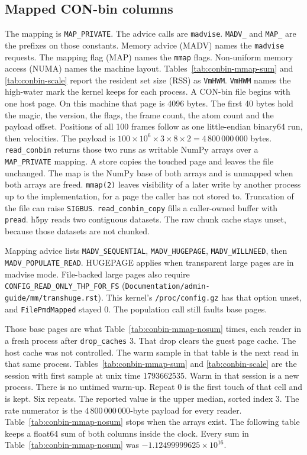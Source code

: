 \subsection{Mapped CON-bin columns} \label{sec:conbin-mmap}

The mapping is \texttt{MAP\_PRIVATE}.
The advice calls are \texttt{madvise}.
\texttt{MADV\_} and \texttt{MAP\_} are the prefixes on those constants.
Memory advice (MADV) names the \texttt{madvise} requests.
The mapping flag (MAP) names the \texttt{mmap} flags.
Non-uniform memory access (NUMA) names the machine layout.
Tables~\ref{tab:conbin-mmap-sum} and \ref{tab:conbin-scale} report the
resident set size (RSS) as \texttt{VmHWM}.
\texttt{VmHWM} names the high-water mark the kernel keeps for each
process.
A CON-bin file begins with one host page.
On this machine that page is 4096 bytes.
The first 40 bytes hold the magic, the version, the flags, the frame
count, the atom count and the payload offset.
Positions of all 100 frames follow as one little-endian binary64 run,
then velocities.
The payload is
\(100 \times 10^{6} \times 3 \times 8 \times 2 = 4\,800\,000\,000\)
bytes.
\texttt{read\_conbin} returns those two runs as writable NumPy arrays
over a \texttt{MAP\_PRIVATE} mapping.
A store copies the touched page and leaves the file unchanged.
The map is the NumPy base of both arrays and is unmapped when both
arrays are freed.
\texttt{mmap(2)} leaves visibility of a later write by another process
up to the implementation, for a page the caller has not stored to.
Truncation of the file can raise \texttt{SIGBUS}.
\texttt{read\_conbin\_copy} fills a caller-owned buffer with
\texttt{pread}.
h5py reads two contiguous datasets.
The raw chunk cache stays unset, because those datasets are not chunked.

Mapping advice lists \texttt{MADV\_SEQUENTIAL}, \texttt{MADV\_HUGEPAGE},
\texttt{MADV\_WILLNEED}, then \texttt{MADV\_POPULATE\_READ}.
HUGEPAGE applies when transparent large pages are in madvise mode.
File-backed large pages also require
\texttt{CONFIG\_READ\_ONLY\_THP\_FOR\_FS}
(\texttt{Documentation/admin-guide/mm/transhuge.rst}).
This kernel's \texttt{/proc/config.gz} has that option unset, and
\texttt{FilePmdMapped} stayed 0.
The population call still faults base pages.

Those base pages are what Table~\ref{tab:conbin-mmap-nosum} times, each
reader in a fresh process after \texttt{drop\_caches} 3.
That drop clears the guest page cache.
The host cache was not controlled.
The warm sample in that table is the next read in that same process.
Tables~\ref{tab:conbin-mmap-sum} and \ref{tab:conbin-scale} are the
session with first sample at unix time 1793662535.
Warm in that session is a new process.
There is no untimed warm-up.
Repeat 0 is the first touch of that cell and is kept.
Six repeats.
The reported value is the upper median, sorted index 3.
The rate numerator is the \(4\,800\,000\,000\)-byte payload for every
reader.
Table~\ref{tab:conbin-mmap-nosum} stops when the arrays exist.
The following table keeps a float64 sum of both columns inside the
clock.
Every sum in Table~\ref{tab:conbin-mmap-nosum} was
\(-1.12499999625 \times 10^{16}\).

